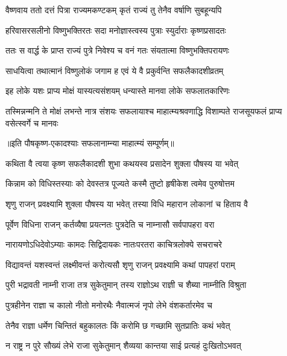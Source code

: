 \twolineshloka
{वैष्णवाय ततो दत्तं पित्रा राज्यमकण्टकम्}
{कृतं राज्यं तु तेनैव वर्षाणि सुबहून्यपि} %

\twolineshloka
{हरिवासरसलीनो विष्णुभक्तिरतः सदा}
{मनोज्ञास्त्वस्य पुत्राः स्युर्दाराः कृष्णप्रसादतः} %

\twolineshloka
{ततः स वार्द्ध के प्राप्त राज्यं पुत्रे निवेश्य च}
{वनं गतः संयतात्मा विष्णुभक्तिपरायणः} %

\twolineshloka
{साधयित्वा तथात्मानं विष्णुलोकं जगाम ह}
{एवं ये वै प्रकुर्वन्ति सफलैकादशीव्रतम्} %

\twolineshloka
{इह लोके यशः प्राप्य मोक्षं यास्यत्यसंशयम्}
{धन्यास्ते मानवा लोके सफलातकारिणः} %


\threelineshloka
{तस्मिन्नन्मनि ते मोक्षं लभन्ते नात्र संशयः}
{सफलायाश्च माहात्म्यश्रवणाद्धि विशाम्पते}
{राजसूयफलं प्राप्य वसेत्स्वर्गे च मानवः} %

॥इति पौषकृष्ण-एकादश्याः सफलानाम्न्या माहात्म्यं सम्पूर्णम्॥



\twolineshloka
{कथिता वै त्वया कृष्ण सफलैकादशी शुभा}
{कथयस्व प्रसादेन शुक्ला पौषस्य या भवेत्} %

\twolineshloka
{किन्नाम को विधिस्तस्याः को देवस्तत्र पूज्यते}
{कस्मै तुष्टो हृषीकेश त्वमेव पुरुषोत्तम} %


\twolineshloka
{शृणु राजन् प्रवक्ष्यामि शुक्ला पौषस्य या भवेत्}
{तस्या विधि महारान लोकानां च हिताय वै} %

\twolineshloka
{पूर्वेण विधिना राजन् कर्तव्यैषा प्रयत्नतः}
{पुत्रदेति च नाम्नासौ सर्वपापहरा वरा} %

\twolineshloka
{नारायणोऽधिदेवोऽम्याः कामदः सिद्विदायकः}
{नातःपरतरा काचित्रलोक्ये सचराचरे} %

\twolineshloka
{विद्यावन्तं यशस्वन्तं लक्ष्मीवन्तं करोत्यसौ}
{शृणु राजन् प्रवक्ष्यामि कथां पापहरां पराम्} %

\twolineshloka
{पुरी भद्रावती नाम्नी राजा तत्र सुकेतुमान्}
{तस्य राज्ञोऽथ राज्ञी च शैब्या नाम्नीति विश्रुता} %

\twolineshloka
{पुत्रहीनेन राज्ञा च कालो नीतो मनोरथैः}
{नैवात्मजं नृपो लेभे वंशकर्तारमेव च} %

\twolineshloka
{तेनैव राज्ञा धर्मेण चिन्तितं बहुकालतः}
{किं करोमि छ गच्छामि सुतप्रातिः कथं भवेत्} %

\twolineshloka
{न राष्ट्र न पुरे सौख्यं लेभे राजा सुकेतुमान्}
{शैव्यया कान्तया साई प्रत्यहं दुःखितोऽभवत्} %


